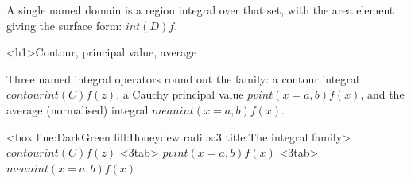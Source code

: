 \documentclass[
  margins=18,
  font=Latin Modern Roman,
  size=12,
  linespread=1.4,
  lang=en
]{scholatex}
\begin{document}
A single named domain is a region integral over that set, with the area
element giving the surface form: $int(D) f$.

<h1>Contour, principal value, average

Three named integral operators round out the family: a contour integral
$contourint(C) f(z)$, a Cauchy principal value $pvint(x=a, b) f(x)$, and
the average (normalised) integral $meanint(x=a, b) f(x)$.

<box line:DarkGreen fill:Honeydew radius:3 title:{The integral family}>{
	$contourint(C) f(z)$ <3tab> $pvint(x=a, b) f(x)$ <3tab> $meanint(x=a, b) f(x)$
}
\end{document}
